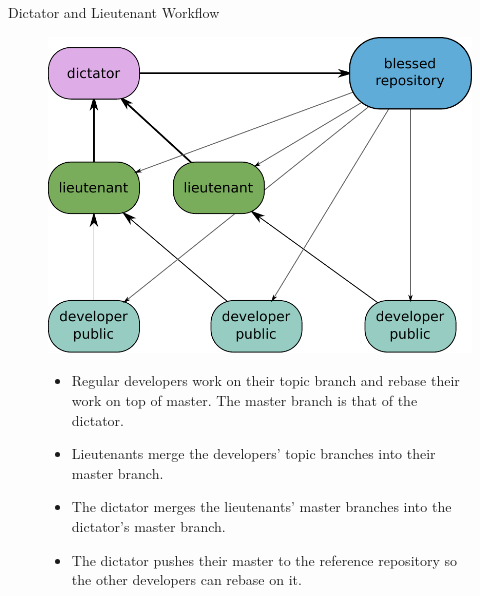 \begin{frame}{Dictator and Lieutenant Workflow}
\begin{figure} 
\centering
\includegraphics[scale=0.3]{images/dictator-and-lieteutnant-workflow.pdf}
\begin{itemize}
\pause \item Regular developers work on their topic branch and rebase their work on top of master. The master branch is that of the dictator.
\pause \item Lieutenants merge the developers’ topic branches into their master branch.
\pause \item The dictator merges the lieutenants’ master branches into the dictator’s master branch.
\pause \item The dictator pushes their master to the reference repository so the other developers can rebase on it.
\end{itemize}
\end{figure}
\end{frame}